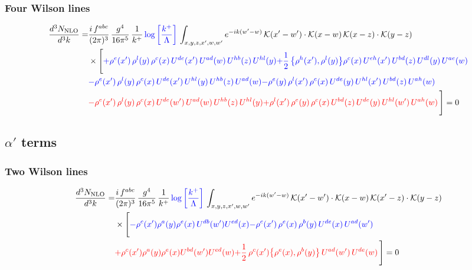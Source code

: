\documentclass[9pt]{article}
\numberwithin{equation}{section}
\begin{document}
\subsubsection{Four Wilson lines}
\begin{align}
\frac{d^{3}N_{\rm NLO}}{d^{3}k} = &\frac{i\,f^{abc}}{(2\pi)^{3}}\,\frac{g^{4}}{16\pi^{5}}\,\frac{1}{k^{+}}\,{\color{blue}\log{\left[\frac{k^{+}}{\Lambda}\right]}}\,\int_{x,y,z,x',w,w'}e^{-ik(w'-w)}\,\mathcal{K}(x'-w')\cdot\mathcal{K}(x-w)\,\mathcal{K}(x-z)\cdot\mathcal{K}(y-z)\notag\\
&\times\Bigg[{\color{blue}+\rho^{e}(x')\, \rho^{l}(y)\,\rho^{c}(x)\, U^{de}(x')\,U^{ad}(w)\,U^{hb}(z)\,U^{hl}(y)}{\color{blue}+\frac{1}{2}\,\big\{\rho^{h}(x'),\rho^{l}(y)\big\}\rho^{c}(x)\,U^{eh}(x')\,U^{bd}(z)\,U^{dl}(y)\,U^{ae}(w)}\notag \\
&{\color{blue}-\rho^{e}(x')\,\rho^{l}(y)\,\rho^{c}(x)\,U^{de}(x')\,U^{hl}(y)\,U^{hb}(z)\,U^{ad}(w)}{\color{blue}-\rho^{e}(y)\,\rho^{l}(x')\,\rho^{c}(x)\,U^{de}(y)\,U^{hl}(x')\,U^{bd}(z)\,U^{ah}(w)} \notag \\ &{\color{red}-\rho^{e}(x')\, \rho^{l}(y)\,\rho^{c}(x)\, U^{de}(w')\,U^{ad}(w)\,U^{hb}(z)\,U^{hl}(y)}{\color{red}+\rho^{l}(x')\,\rho^{e}(y)\,\rho^{c}(x)\,U^{bd}(z)\,U^{de}(y)\,U^{hl}(w')\,U^{ah}(w)}\,\Bigg] = 0
\end{align}
\subsection{$\alpha'$ terms}
\subsubsection{Two Wilson lines}
\begin{align}
\frac{d^{3}N_{\rm NLO}}{d^{3}k}= & \frac{i\,f^{abc}}{(2\pi)^{3}}\,\frac{g^{4}}{16\pi^{5}}\,\frac{1}{k^{+}}\,{\color{blue}\log{\left[\frac{k^{+}}{\Lambda}\right]}}\,\int_{x,y,z,x',w,w'}e^{-ik(w'-w)}\,\mathcal{K}(x'-w')\cdot\mathcal{K}(x-w)\,\mathcal{K}(x'-z)\cdot\mathcal{K}(y-z)\notag \\ & \times\Bigg[ {\color{blue}-\rho^{c}(x') \rho^{a}(y) \rho^{e}(x)\,U^{d b}(w') U^{e d}(x)}{\color{blue}-\rho^{c}(x')\,\rho^{e}(x)\,\rho^{b}(y)\,U^{de}(x)\,U^{ad}(w')}\notag \\
&{\color{red}+\rho^{c}(x') \rho^{a}(y) \rho^{e}(x) U^{b d}(w') U^{e d}(w)}{\color{red}+\frac{1}{2}\,\rho^{c}(x')\big\{\rho^{e}(x),\rho^{b}(y)\big\}\,U^{ad}(w')\,U^{de}(w)}\,\Bigg] = 0
\end{align}
\end{document}
